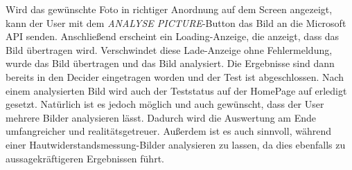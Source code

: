 Wird das gewünschte Foto in richtiger Anordnung auf dem Screen angezeigt, kann der User mit dem \textit{ANALYSE PICTURE}-Button das Bild an die Microsoft API senden. Anschließend erscheint ein Loading-Anzeige, die anzeigt, dass das Bild übertragen wird. Verschwindet diese Lade-Anzeige ohne Fehlermeldung, wurde das Bild übertragen und das Bild analysiert. Die Ergebnisse sind dann bereits in den Decider eingetragen worden und der Test ist abgeschlossen. Nach einem analysierten Bild wird auch der Teststatus auf der HomePage auf erledigt gesetzt. Natürlich ist es jedoch möglich und auch gewünscht, dass der User mehrere Bilder analysieren lässt. Dadurch wird die Auswertung am Ende umfangreicher und realitätsgetreuer. Außerdem ist es auch sinnvoll, während einer Hautwiderstandsmessung-Bilder analysieren zu lassen, da dies ebenfalls zu aussagekräftigeren Ergebnissen führt.

